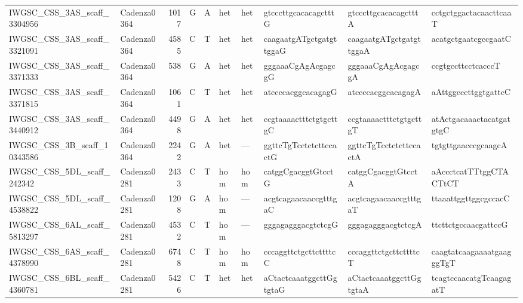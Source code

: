 \begin{longtable}{llrlllllll}
 IWGSC\_CSS\_3AS\_scaff\_3304956  & Cadenza0364 &       1017 & G         & A        & het            & het         & gtcccttgcacacagctttG      & gtcccttgcacacagctttA      & cctgctggactacaacttcaaT    \\
 IWGSC\_CSS\_3AS\_scaff\_3321091  & Cadenza0364 &       4585 & C         & T        & het            & het         & caagaatgATgctgatgttggaG   & caagaatgATgctgatgttggaA   & acatgctgaatcgccgaatC      \\
 IWGSC\_CSS\_3AS\_scaff\_3371333  & Cadenza0364 &        538 & G         & A        & het            & het         & gggaaaCgAgAcgagcgG        & gggaaaCgAgAcgagcgA        & ccgtgccttcctcacccT        \\
 IWGSC\_CSS\_3AS\_scaff\_3371815  & Cadenza0364 &       1061 & C         & T        & het            & het         & atccccacggcacagagG        & atccccacggcacagagA        & aAttggcccttggtgattcC      \\
 IWGSC\_CSS\_3AS\_scaff\_3440912  & Cadenza0364 &       4498 & G         & A        & het            & het         & ccgtaaaactttctgtgcttgC    & ccgtaaaactttctgtgcttgT    & atActgacaaactacatgatgtgC  \\
 IWGSC\_CSS\_3B\_scaff\_10343586  & Cadenza0364 &       2242 & G         & A        & het            & ---         & ggttcTgTcctctcttccactG    & ggttcTgTcctctcttccactA    & tgtgttgaacccgcaagcA       \\
 IWGSC\_CSS\_5DL\_scaff\_242342   & Cadenza0281 &       2433 & C         & T        & hom            & hom         & catggCgacggtGtcctG        & catggCgacggtGtcctA        & aAccctcatTTtggCTACTtCT    \\
 IWGSC\_CSS\_5DL\_scaff\_4538822  & Cadenza0281 &       1208 & G         & A        & hom            & ---         & acgtcagaacaaccgtttgaC     & acgtcagaacaaccgtttgaT     & ttaaattggttggcgccacC      \\
 IWGSC\_CSS\_6AL\_scaff\_5813297  & Cadenza0281 &       4532 & C         & T        & hom            & ---         & gggagagggacgtctcgG        & gggagagggacgtctcgA        & ttcttctgccaacgattccG      \\
 IWGSC\_CSS\_6AS\_scaff\_4378990  & Cadenza0281 &       6748 & C         & T        & hom            & hom         & cccaggttctgcttcttttcC     & cccaggttctgcttcttttcT     & caagtatcaagaaaatgaagggTgT \\
 IWGSC\_CSS\_6BL\_scaff\_4360781  & Cadenza0281 &       5426 & C         & T        & het            & het         & aCtactcaaatggcttGgtgtaG   & aCtactcaaatggcttGgtgtaA   & tcagtccaacatgTcaagagatT   \\

\end{longtable}
